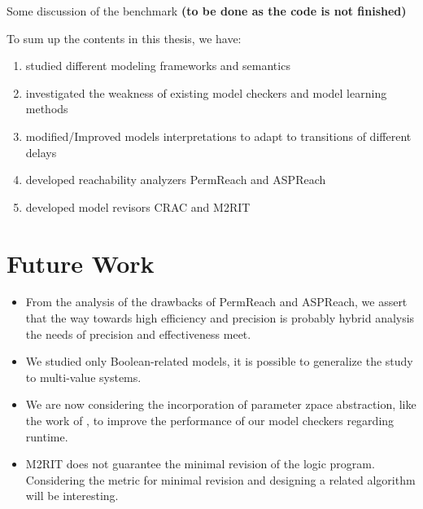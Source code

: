 Some discussion of the benchmark \textbf{(to be done as the code is not finished)}

To sum up the contents in this thesis, we have:

\begin{enumerate}
    \item studied different modeling frameworks and semantics
    \item investigated the weakness of existing model checkers and model learning methods
    \item modified/Improved models interpretations to adapt to transitions of different delays
    \item developed reachability analyzers PermReach and ASPReach
    \item developed model revisors CRAC and M2RIT
\end{enumerate}

\section{Future Work}

\begin{itemize}
    \item From the analysis of the drawbacks of PermReach and ASPReach, we assert that the way towards high efficiency and precision is probably hybrid analysis the needs of precision and effectiveness meet.

    \item We studied only Boolean-related models, it is possible to generalize the study to multi-value systems.
    \item We are now considering the incorporation of parameter zpace abstraction, like the work of \cite{PRNs-TCS18}, to
    improve the performance of our model checkers regarding runtime.
    \item M2RIT does not guarantee the minimal revision of the logic program.
    Considering the metric for minimal revision and designing a related algorithm will be interesting.
\end{itemize}